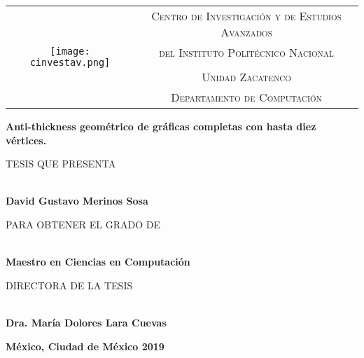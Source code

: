\thispagestyle{empty}

\begin{tabular}{cc}
\multirow{5}{*}{\texttt{[image: cinvestav.png]}} & \textsc{Centro de Investigaci\'on y de Estudios Avanzados} \\
  & \textsc{del Instituto Polit\'ecnico Nacional} \\
  & \\
  & \textsc{Unidad Zacatenco} \\
  & \textsc{Departamento de Computaci\'on} \\
\end{tabular}

\vspace{2cm}

\begin{center}
{
  \textbf{\Large Anti-thickness geométrico de gráficas completas con hasta diez vértices.}\\

  {\large
    \vspace{2cm}
    \begin{small} TESIS QUE PRESENTA \end{small} \\
    \textbf{David Gustavo Merinos Sosa} \\

    \vspace{1cm}
    \begin{small} PARA OBTENER EL GRADO DE \end{small} \\
    \textbf{Maestro en Ciencias en Computaci\'on} \\

    \vspace{2cm}
    \begin{small} DIRECTORA DE LA TESIS \end{small}\\
    \textbf{Dra. María Dolores Lara Cuevas} \\
  }
}
\end{center}

\vfill

\textbf{M\'exico, Ciudad de M\'exico \hfill  2019}
\newpage

